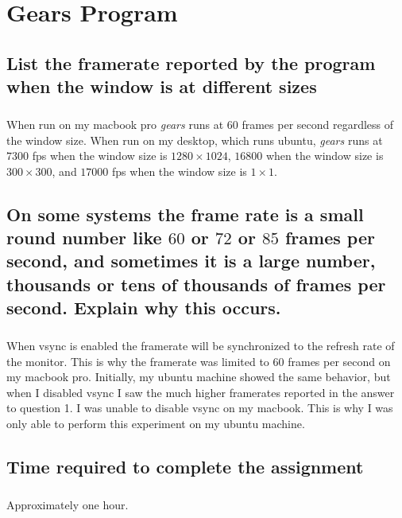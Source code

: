 \documentclass[11pt]{article}
\begin{document}
\thispagestyle{empty}

\newlength{\boxlength}\setlength{\boxlength}{\textwidth}
\addtolength{\boxlength}{-4mm}

\begin{center}
\end{center}




\section{Gears Program}

\subsection{List the framerate reported by the program when the window is at different sizes}

\subparagraph{}

When run on my macbook pro \textit{gears} runs at $60$ frames per second regardless of the window size. When run on my desktop, which runs ubuntu, \textit{gears} runs at $7300$ fps when the window size is $1280\times1024$, $16800$ when the window size is $300\times300$, and $17000$ fps when the window size is $1\times1$.

\subsection{On some systems the frame rate is a small round number like $60$ or $72$ or $85$ frames per second, and sometimes it is a large number, thousands or tens of thousands of frames per second. Explain why this occurs.}

\subparagraph{}

When vsync is enabled the framerate will be synchronized to the refresh rate of the monitor. This is why the framerate was limited to $60$ frames per second on my macbook pro. Initially, my ubuntu machine showed the same behavior, but when I disabled vsync I saw the much higher framerates reported in the answer to question 1. I was unable to disable vsync on my macbook. This is why I was only able to perform this experiment on my ubuntu machine.

\subsection{Time required to complete the assignment}

\subparagraph{}

Approximately one hour.
\end{document}
